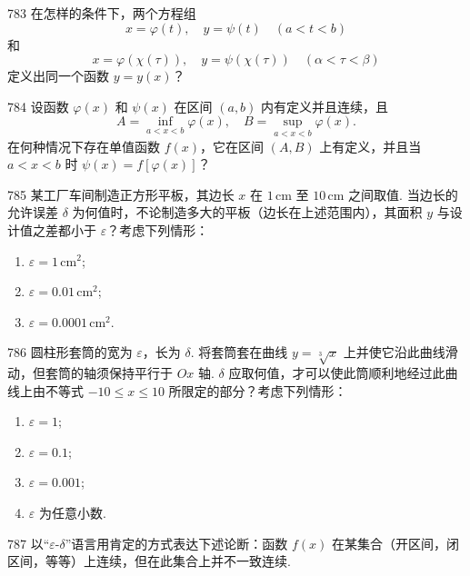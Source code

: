 \begin{prob}[M]{783}
在怎样的条件下，两个方程组
\[
x = \varphi(t), \quad y = \psi(t) \quad (a < t < b)
\]
和
\[
x = \varphi(\chi(\tau)), \quad y = \psi(\chi(\tau)) \quad (\alpha < \tau < \beta)
\]
定义出同一个函数 $y = y(x)$？
\end{prob}

\begin{prob}[M]{784}
设函数 $\varphi(x)$ 和 $\psi(x)$ 在区间 $(a, b)$ 内有定义并且连续，且
\[
A = \inf_{a < x < b} \varphi(x), \quad B = \sup_{a < x < b} \varphi(x).
\]
在何种情况下存在单值函数 $f(x)$，它在区间 $(A, B)$ 上有定义，并且当 $a < x < b$ 时 $\psi(x) = f[\varphi(x)]$？
\end{prob}


\begin{prob}[L]{785}
某工厂车间制造正方形平板，其边长 $x$ 在 $1\,\mathrm{cm}$ 至 $10\,\mathrm{cm}$ 之间取值. 当边长的允许误差 $\delta$ 为何值时，不论制造多大的平板（边长在上述范围内），其面积 $y$ 与设计值之差都小于 $\varepsilon$？考虑下列情形：
\begin{enumerate}[label=(\alph*), itemsep=2pt, topsep=3pt]
    \item $\varepsilon = 1\,\mathrm{cm}^2$;
    \item $\varepsilon = 0.01\,\mathrm{cm}^2$;
    \item $\varepsilon = 0.0001\,\mathrm{cm}^2.$
\end{enumerate}
\end{prob}

\begin{prob}[L]{786}
圆柱形套筒的宽为 $\varepsilon$，长为 $\delta$. 将套筒套在曲线 $y = \sqrt[3]{x}$ 上并使它沿此曲线滑动，但套筒的轴须保持平行于 $Ox$ 轴. $\delta$ 应取何值，才可以使此筒顺利地经过此曲线上由不等式 $-10 \leqslant x \leqslant 10$ 所限定的部分？考虑下列情形：
\begin{enumerate}[label=(\alph*), itemsep=2pt, topsep=3pt]
    \item $\varepsilon = 1$;
    \item $\varepsilon = 0.1$;
    \item $\varepsilon = 0.001$;
    \item $\varepsilon$ 为任意小数.
\end{enumerate}
\end{prob}

\begin{prob}[M]{787}
以“$\varepsilon\text{-}\delta$”语言用肯定的方式表达下述论断：函数 $f(x)$ 在某集合（开区间，闭区间，等等）上连续，但在此集合上并不一致连续.
\end{prob}

